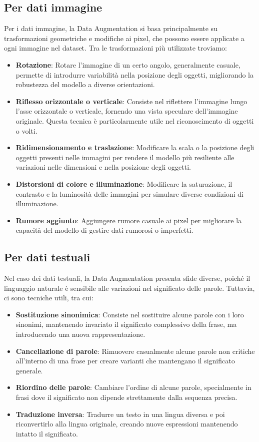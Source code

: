 \subsection{Per dati immagine}
Per i dati immagine, la Data Augmentation si basa principalmente su trasformazioni geometriche e modifiche ai pixel, che possono essere applicate a ogni immagine nel dataset. Tra le trasformazioni più utilizzate troviamo:

\begin{itemize}
    \item \textbf{Rotazione}: Rotare l'immagine di un certo angolo, generalmente casuale, permette di introdurre variabilità nella posizione degli oggetti, migliorando la robustezza del modello a diverse orientazioni.
    \item \textbf{Riflesso orizzontale o verticale}: Consiste nel riflettere l'immagine lungo l'asse orizzontale o verticale, fornendo una vista speculare dell'immagine originale. Questa tecnica è particolarmente utile nel riconoscimento di oggetti o volti.
    \item \textbf{Ridimensionamento e traslazione}: Modificare la scala o la posizione degli oggetti presenti nelle immagini per rendere il modello più resiliente alle variazioni nelle dimensioni e nella posizione degli oggetti.
    \item \textbf{Distorsioni di colore e illuminazione}: Modificare la saturazione, il contrasto e la luminosità delle immagini per simulare diverse condizioni di illuminazione.
    \item \textbf{Rumore aggiunto}: Aggiungere rumore casuale ai pixel per migliorare la capacità del modello di gestire dati rumorosi o imperfetti.
\end{itemize}

\subsection{Per dati testuali}
Nel caso dei dati testuali, la Data Augmentation presenta sfide diverse, poiché il linguaggio naturale è sensibile alle variazioni nel significato delle parole. Tuttavia, ci sono tecniche utili, tra cui:

\begin{itemize}
    \item \textbf{Sostituzione sinonimica}: Consiste nel sostituire alcune parole con i loro sinonimi, mantenendo invariato il significato complessivo della frase, ma introducendo una nuova rappresentazione.
    \item \textbf{Cancellazione di parole}: Rimuovere casualmente alcune parole non critiche all'interno di una frase per creare varianti che mantengano il significato generale.
    \item \textbf{Riordino delle parole}: Cambiare l’ordine di alcune parole, specialmente in frasi dove il significato non dipende strettamente dalla sequenza precisa.
    \item \textbf{Traduzione inversa}: Tradurre un testo in una lingua diversa e poi riconvertirlo alla lingua originale, creando nuove espressioni mantenendo intatto il significato.
\end{itemize}

